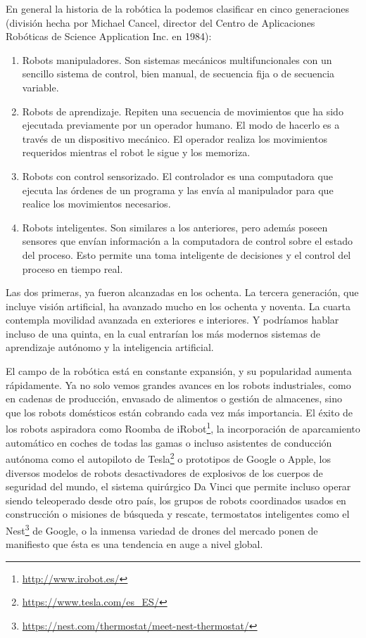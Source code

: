 En general la historia de la robótica la podemos clasificar en cinco generaciones (división hecha por Michael Cancel, director del Centro de Aplicaciones Robóticas de Science Application Inc. en 1984): 
\begin{enumerate}[1.ª Generación]
	\item[1.ª Generación] Robots manipuladores. Son sistemas mecánicos multifuncionales con un sencillo sistema de control, bien manual, de secuencia fija o de secuencia variable.
	\item[2.ª Generación] Robots de aprendizaje. Repiten una secuencia de movimientos que ha sido ejecutada previamente por un operador humano. El modo de hacerlo es a través de un dispositivo mecánico. El operador realiza los movimientos requeridos mientras el robot le sigue y los memoriza.
	\item[3.ª Generación] Robots con control sensorizado. El controlador es una computadora que ejecuta las órdenes de un programa y las envía al manipulador para que realice los movimientos necesarios.
	\item[4.ª Generación] Robots inteligentes. Son similares a los anteriores, pero además poseen sensores que envían información a la computadora de control sobre el estado del proceso. Esto permite una toma inteligente de decisiones y el control del proceso en tiempo real.
\end{enumerate}

Las dos primeras, ya fueron alcanzadas en los ochenta. La tercera generación, que incluye visión artificial, ha avanzado mucho en los ochenta y noventa. La cuarta contempla movilidad avanzada en exteriores e interiores. Y podríamos hablar incluso de una quinta, en la cual entrarían los más modernos sistemas de aprendizaje autónomo y la inteligencia artificial.

El campo de la robótica está en constante expansión, y su popularidad aumenta rápidamente. Ya no solo vemos grandes avances en los robots industriales, como en cadenas de producción, envasado de alimentos o gestión de almacenes, sino que los robots domésticos están cobrando cada vez más importancia. El éxito de los robots aspiradora como Roomba de iRobot\footnote{\url{http://www.irobot.es/}}, la incorporación de aparcamiento automático en coches de todas las gamas o incluso asistentes de conducción autónoma como el autopiloto de Tesla\footnote{\url{https://www.tesla.com/es_ES/}} o prototipos de Google o Apple, los diversos modelos de robots desactivadores de explosivos de los cuerpos de seguridad del mundo, el sistema quirúrgico Da Vinci que permite incluso operar siendo teleoperado desde otro país, los grupos de robots coordinados usados en construcción o misiones de búsqueda y rescate, termostatos inteligentes como el Nest\footnote{\url{https://nest.com/thermostat/meet-nest-thermostat/}} de Google, o la inmensa variedad de drones del mercado ponen de manifiesto que ésta es una tendencia en auge a nivel global.

